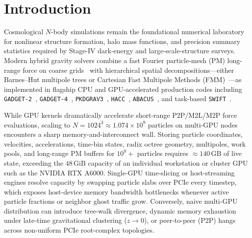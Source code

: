 \documentclass[aps,prd,reprint,superscriptaddress,nofootinbib,amsmath,amssymb,floatfix,longbibliography]{revtex4-2}
\begin{document}
\maketitle

\section{Introduction}\label{sec:intro}

Cosmological $N$-body simulations remain the foundational numerical laboratory for nonlinear structure formation, halo mass functions, and precision summary statistics required by Stage-IV dark-energy and large-scale-structure surveys. Modern hybrid gravity solvers combine a fast Fourier particle-mesh (PM) long-range force on coarse grids~\citep{Hockney1988} with hierarchical spatial decompositions---either Barnes--Hut multipole trees or Cartesian Fast Multipole Methods (FMM)~\citep{Dehnen2000FMM,Dehnen2014FMM}---as implemented in flagship CPU and GPU-accelerated production codes including \texttt{GADGET-2}~\citep{Springel2005GADGET2}, \texttt{GADGET-4}~\citep{Springel2021GADGET4}, \texttt{PKDGRAV3}~\citep{Potter2017PKDGRAV3}, \texttt{HACC}~\citep{Habib2016HACC}, \texttt{ABACUS}~\citep{Garrison2021ABACUS}, and task-based \texttt{SWIFT}~\citep{Schaller2024SWIFT}.

While GPU kernels dramatically accelerate short-range P2P/M2L/M2P force evaluations, scaling to $N = 1024^3 \approx 1.074 \times 10^9$ particles on multi-GPU nodes encounters a sharp memory-and-interconnect wall. Storing particle coordinates, velocities, accelerations, time-bin states, radix octree geometry, multipoles, work pools, and long-range PM buffers for $10^9+$ particles requires $\approx 140\,\mathrm{GB}$ of live state, exceeding the $48\,\mathrm{GiB}$ capacity of an individual workstation or cluster GPU such as the NVIDIA RTX A6000. Single-GPU time-slicing or host-streaming engines resolve capacity by swapping particle slabs over PCIe every timestep, which exposes host-device memory bandwidth bottlenecks whenever active particle fractions or neighbor ghost traffic grow. Conversely, naive multi-GPU distribution can introduce tree-walk divergence, dynamic memory exhaustion under late-time gravitational clustering ($z \rightarrow 0$), or peer-to-peer (P2P) hangs across non-uniform PCIe root-complex topologies.
\end{document}
